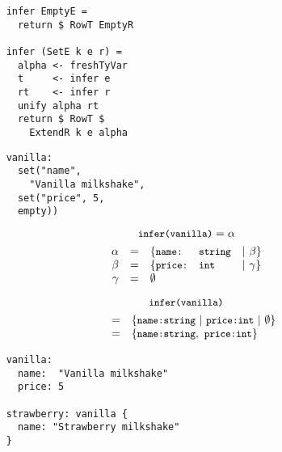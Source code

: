 \documentclass[20pt]{beamer}
\newcommand{\code}[1]{
    \texttt{\small{#1}}
}
\begin{document}
\begin{frame}
    \begin{lstlisting}
    infer EmptyE =
      return $ RowT EmptyR

    infer (SetE k e r) =
      alpha <- freshTyVar
      t     <- infer e
      rt    <- infer r
      unify alpha rt
      return $ RowT $
        ExtendR k e alpha
    \end{lstlisting}
\end{frame}

\begin{frame}
    \begin{lstlisting}
    vanilla:
      set("name",
        "Vanilla milkshake",
      set("price", 5,
      empty))
    \end{lstlisting}
\end{frame}

\begin{frame}
    \[
    \code{infer(vanilla)} = \alpha
    \]
    \[
    \begin{array}{rclll}
    \alpha  & = & \{ \code{name:}  & \code{string} & | ~ \beta  \} \\
    \beta   & = & \{ \code{price:} & \code{int}    & | ~ \gamma \} \\
    \gamma  & = & \emptyset                                        \\
    \end{array}
    \]
\end{frame}

\begin{frame}
    \[
    \code{infer(vanilla)}
    \]
    \[
    \begin{array}{lll}
    ~ & = & \{ \code{name:} \code{string} ~ | ~
               \code{price:} \code{int} ~ | ~ \emptyset \} \\
    ~ & = & \{ \code{name:} \code{string}, ~ \code{price:} \code{int} \} \\
    \end{array}
    \]
\end{frame}

\begin{frame}
    \begin{lstlisting}
    vanilla:
      name:  "Vanilla milkshake"
      price: 5

    strawberry: vanilla {
      name: "Strawberry milkshake"
    }
    \end{lstlisting}
\end{frame}
\end{document}
